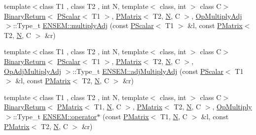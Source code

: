 \begin{DoxyCompactItemize}
\item 
{\footnotesize template$<$class T1 , class T2 , int N, template$<$ class, int $>$ class C$>$ }\\\mbox{\hyperlink{structENSEM_1_1BinaryReturn}{Binary\+Return}}$<$ \mbox{\hyperlink{classENSEM_1_1PScalar}{P\+Scalar}}$<$ T1 $>$, \mbox{\hyperlink{classENSEM_1_1PMatrix}{P\+Matrix}}$<$ T2, \mbox{\hyperlink{adat__devel_2lib_2hadron_2operator__name__util_8cc_a7722c8ecbb62d99aee7ce68b1752f337}{N}}, C $>$, \mbox{\hyperlink{structENSEM_1_1OpMultiplyAdj}{Op\+Multiply\+Adj}} $>$\+::Type\+\_\+t \mbox{\hyperlink{group__primmatrix_ga500e40c33d8e7e4a2a95970fb8a56326}{E\+N\+S\+E\+M\+::multiply\+Adj}} (const \mbox{\hyperlink{classENSEM_1_1PScalar}{P\+Scalar}}$<$ T1 $>$ \&l, const \mbox{\hyperlink{classENSEM_1_1PMatrix}{P\+Matrix}}$<$ T2, \mbox{\hyperlink{adat__devel_2lib_2hadron_2operator__name__util_8cc_a7722c8ecbb62d99aee7ce68b1752f337}{N}}, C $>$ \&r)
\item 
{\footnotesize template$<$class T1 , class T2 , int N, template$<$ class, int $>$ class C$>$ }\\\mbox{\hyperlink{structENSEM_1_1BinaryReturn}{Binary\+Return}}$<$ \mbox{\hyperlink{classENSEM_1_1PScalar}{P\+Scalar}}$<$ T1 $>$, \mbox{\hyperlink{classENSEM_1_1PMatrix}{P\+Matrix}}$<$ T2, \mbox{\hyperlink{adat__devel_2lib_2hadron_2operator__name__util_8cc_a7722c8ecbb62d99aee7ce68b1752f337}{N}}, C $>$, \mbox{\hyperlink{structENSEM_1_1OpAdjMultiplyAdj}{Op\+Adj\+Multiply\+Adj}} $>$\+::Type\+\_\+t \mbox{\hyperlink{group__primmatrix_ga5b52c2e633a016e706b74e388b8af102}{E\+N\+S\+E\+M\+::adj\+Multiply\+Adj}} (const \mbox{\hyperlink{classENSEM_1_1PScalar}{P\+Scalar}}$<$ T1 $>$ \&l, const \mbox{\hyperlink{classENSEM_1_1PMatrix}{P\+Matrix}}$<$ T2, \mbox{\hyperlink{adat__devel_2lib_2hadron_2operator__name__util_8cc_a7722c8ecbb62d99aee7ce68b1752f337}{N}}, C $>$ \&r)
\item 
{\footnotesize template$<$class T1 , class T2 , int N, template$<$ class, int $>$ class C$>$ }\\\mbox{\hyperlink{structENSEM_1_1BinaryReturn}{Binary\+Return}}$<$ \mbox{\hyperlink{classENSEM_1_1PMatrix}{P\+Matrix}}$<$ T1, \mbox{\hyperlink{adat__devel_2lib_2hadron_2operator__name__util_8cc_a7722c8ecbb62d99aee7ce68b1752f337}{N}}, C $>$, \mbox{\hyperlink{classENSEM_1_1PMatrix}{P\+Matrix}}$<$ T2, \mbox{\hyperlink{adat__devel_2lib_2hadron_2operator__name__util_8cc_a7722c8ecbb62d99aee7ce68b1752f337}{N}}, C $>$, \mbox{\hyperlink{structENSEM_1_1OpMultiply}{Op\+Multiply}} $>$\+::Type\+\_\+t \mbox{\hyperlink{group__primmatrix_ga8f46104c9d9d10301141fdd1c0546a36}{E\+N\+S\+E\+M\+::operator$\ast$}} (const \mbox{\hyperlink{classENSEM_1_1PMatrix}{P\+Matrix}}$<$ T1, \mbox{\hyperlink{adat__devel_2lib_2hadron_2operator__name__util_8cc_a7722c8ecbb62d99aee7ce68b1752f337}{N}}, C $>$ \&l, const \mbox{\hyperlink{classENSEM_1_1PMatrix}{P\+Matrix}}$<$ T2, \mbox{\hyperlink{adat__devel_2lib_2hadron_2operator__name__util_8cc_a7722c8ecbb62d99aee7ce68b1752f337}{N}}, C $>$ \&r)

\end{DoxyCompactItemize}

